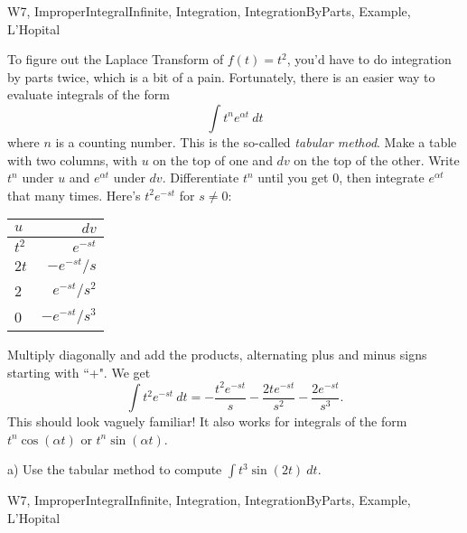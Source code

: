 \begin{tagblock}{W7, ImproperIntegralInfinite, Integration, IntegrationByParts, Example, L'Hopital}
\begin{question}
	
To figure out the Laplace Transform of $f(t)=t^2$, you'd have to do integration by parts twice, which is a bit of a pain. Fortunately, there is an easier way to evaluate integrals of the form 
\[
\int t^n e^{\alpha t} \ dt
\]
where $n$ is a counting number. This is the so-called \textit{tabular method}. Make a table with two columns, with $u$ on the top of one and $dv$ on the top of the other. Write $t^n$ under $u$ and $e^{\alpha t}$ under $dv$. Differentiate $t^n$ until you get 0, then integrate $e^{\alpha t}$ that many times. Here's $t^2e^{-st}$ for $s\ne 0$:

\begin{center}
\begin{tabular}{| l | r |} \hline $u$ & $dv$ \\ \hline $t^2$ & $e^{-st}$ \\ \hline $2t$ & $-e^{-st}/s$ \\ \hline 2 & $e^{-st}/s^2$ \\ \hline 0 & $-e^{-st}/s^3$ \\ \hline
\end{tabular}
\end{center}

Multiply diagonally and add the products, alternating plus and minus signs starting with ``+". We get
\[
\int t^2e^{-st} \ dt=-\frac{t^2e^{-st}}s-\frac{2te^{-st}}{s^2}-\frac{2e^{-st}}{s^3}.
\]
This should look vaguely familiar! It also works for integrals of the form $t^n\cos(\alpha t)$ or $t^n\sin(\alpha t)$. 

\bigskip

a) Use the tabular method to compute $\displaystyle\int t^3\sin(2t) \ dt$. 

    
\begin{tags}
        W7, ImproperIntegralInfinite, Integration, IntegrationByParts, Example, L'Hopital
\end{tags}
    
\begin{diary}
        
\end{diary}
	
\begin{solution}

\end{solution}
	
\end{question}

\end{tagblock}

